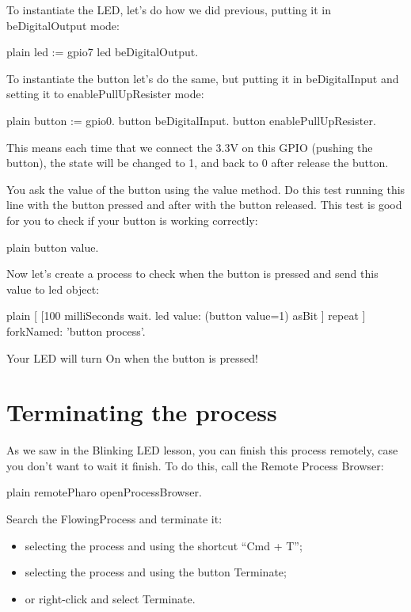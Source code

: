 \documentclass[10pt,twoside,english]{_support/latex/sbabook/sbabook}
\begin{document}
To instantiate the LED, let’s do how we did previous, putting it in beDigitalOutput mode:

\begin{displaycode}{plain}
led := gpio7
led beDigitalOutput.
\end{displaycode}

To instantiate the button let’s do the same, but putting it in beDigitalInput and setting it to enablePullUpResister mode:

\begin{displaycode}{plain}
button := gpio0.
button beDigitalInput.
button enablePullUpResister.
\end{displaycode}

This means each time that we connect the 3.3V on this GPIO (pushing the button), the state will be changed to 1, and back to 0 after release the button.

You ask the value of the button using the value method. Do this test running this line with the button pressed and after with the button released. This test is good for you to check if your button is working correctly:

\begin{displaycode}{plain}
button value.
\end{displaycode}

Now let’s create a process to check when the button is pressed and send this value to led object:

\begin{displaycode}{plain}
[ [100 milliSeconds wait. 
	led value: (button value=1) asBit
		] repeat	
	 ] forkNamed: 'button process'.
\end{displaycode}

Your LED will turn On when the button is pressed!
\section{Terminating the process}
As we saw in the Blinking LED lesson, you can finish this process remotely, case you don’t want to wait it finish. To do this, call the Remote Process Browser:

\begin{displaycode}{plain}
 remotePharo openProcessBrowser.
\end{displaycode}

Search the FlowingProcess and terminate it:

\begin{itemize}
\item selecting the process and using the shortcut “Cmd + T”;
\item selecting the process and using the button Terminate;
\item or right-click and select Terminate.
\end{itemize}
\end{document}
